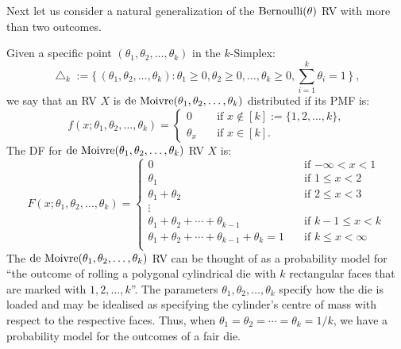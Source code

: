 Next let us consider a natural generalization of the $\mbox{{\rm Bernoulli}}(\theta)$ RV with more than two outcomes.
\begin{model}\label{M:deMoivre}
Given a specific point $(\theta_1,\theta_2,\ldots,\theta_k)$ in the $k$-Simplex:
\[
\bigtriangleup_k :=  \{ \,  ( \theta_1,\theta_2,\ldots,\theta_k) :  \theta_1 \geq 0, \theta_2 \geq 0, \ldots, \theta_k \geq 0, \sum_{i=1}^k \theta_i = 1 \, \}  \ ,
\]
we say that an RV $X$ is $\mbox{{\rm de~Moivre}}(\theta_1,\theta_2,\ldots,\theta_k)$ distributed if its PMF is:
\[
f(x;\theta_1,\theta_2,\ldots,\theta_k) =
\begin{cases}
0 & \quad \text{if $x \notin [k] := \{1,2,\ldots,k\}$,} \\
\theta_x & \quad \text{if $x \in [k]$}   .
\end{cases}
\]
The DF for $\mbox{{\rm de~Moivre}}(\theta_1,\theta_2,\ldots,\theta_k)$ RV $X$ is:
\begin{equation}\label{E:deMoivreDF}
F(x;\theta_1,\theta_2,\ldots,\theta_k) =
\begin{cases}
0 & \quad  \text{if $-\infty < x < 1$}\\
\theta_1 & \quad \text{if $1 \leq x < 2$} \\
\theta_1+\theta_2 & \quad \text{if $2 \leq x < 3$} \\
\vdots & \\
\theta_1+\theta_2+\cdots+\theta_{k-1} & \quad \text{if $k-1 \leq x < k$} \\
\theta_1+\theta_2+\cdots+\theta_{k-1}+\theta_k=1 & \quad \text{if $k \leq x < \infty$} \\
\end{cases}
\end{equation}
The $\mbox{{\rm de~Moivre}}(\theta_1,\theta_2,\ldots,\theta_k)$ RV can be thought of as a probability model for ``the outcome  of rolling a polygonal cylindrical die with $k$ rectangular faces that are marked with $1, 2, \ldots, k$''.  The parameters $\theta_1,\theta_2,\ldots,\theta_k$ specify how the die is loaded and may be idealised as specifying the cylinder's centre of mass with respect to the respective faces.  Thus, when $\theta_1=\theta_2=\cdots=\theta_k=1/k$, we have a probability model for the outcomes of a fair die.
\end{model}


